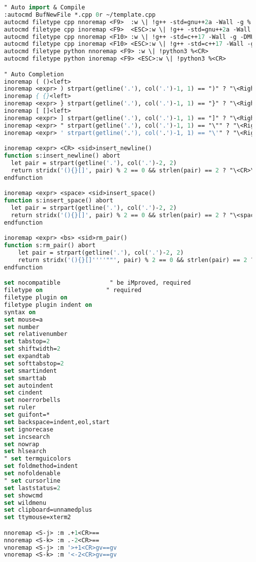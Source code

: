 \begin{lstlisting}[language= Pascal, commentstyle=\color{black}, numberstyle=\tiny\color{black}, keywordstyle=\color{black}, stringstyle=\color{black},
]
" Auto import & Compile
:autocmd BufNewFile *.cpp 0r ~/template.cpp
autocmd filetype cpp nnoremap <F9>  :w \| !g++ -std=gnu++2a -Wall -g % -o %:r && ./%:r<CR>
autocmd filetype cpp inoremap <F9>  <ESC>:w \| !g++ -std=gnu++2a -Wall -g % -o %:r && ./%:r<CR>
autocmd filetype cpp nnoremap <F10> :w \| !g++ -std=c++17 -Wall -g -DMUSHFIQ_DEBUG -DDBG_MACRO_NO_WARNING % -o %:r && ./%:r<CR>
autocmd filetype cpp inoremap <F10> <ESC>:w \| !g++ -std=c++17 -Wall -g -DMUSHFIQ_DEBUG -DDBG_MACRO_NO_WARNING % -o %:r && ./%:r<CR>
autocmd filetype python nnoremap <F9> :w \| !python3 %<CR>
autocmd filetype python inoremap <F9> <ESC>:w \| !python3 %<CR>

" Auto Completion
inoremap ( ()<left>
inoremap <expr> ) strpart(getline('.'), col('.')-1, 1) == ")" ? "\<Right>" : ")"
inoremap { {}<left>
inoremap <expr> } strpart(getline('.'), col('.')-1, 1) == "}" ? "\<Right>" : "}"
inoremap [ []<left>
inoremap <expr> ] strpart(getline('.'), col('.')-1, 1) == "]" ? "\<Right>" : "]"
inoremap <expr> " strpart(getline('.'), col('.')-1, 1) == "\"" ? "\<Right>" : "\"\"\<left>"
inoremap <expr> ' strpart(getline('.'), col('.')-1, 1) == "\'" ? "\<Right>" : "\'\'\<left>"

inoremap <expr> <CR> <sid>insert_newline()
function s:insert_newline() abort
  let pair = strpart(getline('.'), col('.')-2, 2)
  return stridx('(){}[]', pair) % 2 == 0 && strlen(pair) == 2 ? "\<CR>\<ESC>\O" : "\<CR>"
endfunction

inoremap <expr> <space> <sid>insert_space()
function s:insert_space() abort
  let pair = strpart(getline('.'), col('.')-2, 2)
  return stridx('(){}[]', pair) % 2 == 0 && strlen(pair) == 2 ? "\<space>\<space>\<left>" : "\<space>"
endfunction

inoremap <expr> <bs> <sid>rm_pair()
function s:rm_pair() abort
	let pair = strpart(getline('.'), col('.')-2, 2)
	return stridx('(){}[]''''""', pair) % 2 == 0 && strlen(pair) == 2 ? "\<del>\<bs>" : "\<bs>"
endfunction

set nocompatible              " be iMproved, required
filetype on                  " required
filetype plugin on
filetype plugin indent on
syntax on
set mouse=a
set number
set relativenumber
set tabstop=2
set shiftwidth=2
set expandtab
set softtabstop=2
set smartindent
set smarttab
set autoindent
set cindent
set noerrorbells
set ruler
set guifont=*
set backspace=indent,eol,start
set ignorecase
set incsearch
set nowrap
set hlsearch
" set termguicolors
set foldmethod=indent
set nofoldenable
" set cursorline
set laststatus=2
set showcmd
set wildmenu
set clipboard=unnamedplus
set ttymouse=xterm2

nnoremap <S-j> :m .+1<CR>==
nnoremap <S-k> :m .-2<CR>==
vnoremap <S-j> :m '>+1<CR>gv==gv
vnoremap <S-k> :m '<-2<CR>gv==gv
\end{lstlisting}


